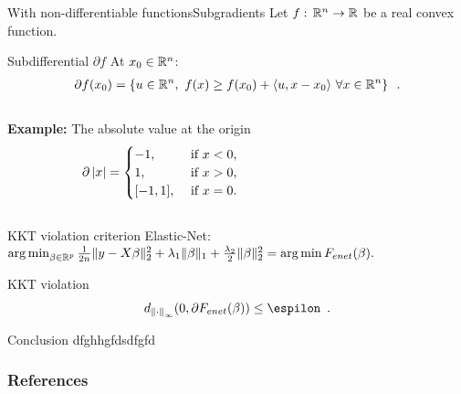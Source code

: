\documentclass[10pt,aspectratio=43]{beamer}
\begin{document}
\begin{frame}{With non-differentiable functions}{Subgradients}
Let $f:\,\mathbb{R}^n\rightarrow \mathbb{R}$ be a real convex function.
\begin{block}{Subdifferential $\partial f$}
    At $x_0\in\mathbb{R}^n$:
    \begin{align*}
        \partial f(x_0) = \left\{ u \in \mathbb{R}^n,\ f(x) \geq f(x_0) +
        \langle u, x-x_0\rangle\ \forall x\in \mathbb{R}^n\right\}
        \enspace.
    \end{align*}
\end{block}
\begin{columns}
\begin{column}{.4\textwidth}
\textbf{Example: } The absolute value at the origin
\[\partial \left \vert x \right \vert =
\begin{cases}
    -1, & \text{ if } x <0, \\
    1, & \text{ if }x>0, \\
    [-1, 1],& \text{ if } x=0. \end{cases}
\]
\end{column}
\begin{column}{.6\textwidth}
\begin{figure}[h]
    \centering
{}
\end{figure}
\end{column}
\end{columns}
\end{frame}

\begin{frame}{KKT violation criterion}
Elastic-Net: $\mathop{\mathrm{arg\,min}}_{\beta\in\mathbb{R}^p}
        \frac{1}{2n} \|y - X\beta\|^2_2 + \lambda_1 \|\beta\|_1 +
        \frac{\lambda_2}{2}\|\beta\|^2_2 = \mathop{\mathrm{arg\,min}} F_{enet}(\beta).$

\begin{block}{KKT violation}
\begin{align*}
    d_{\norm{\cdot}_\infty}(0, \partial F_{enet}(\beta)) \leq \espilon\enspace.
\end{align*}
\end{block}

\end{frame}

\begin{frame}{Conclusion}
    dfghhgfdsdfgfd
\end{frame}



\begin{frame}[allowframebreaks]{}
    \frametitle{References}
    
\end{frame}
\end{document}
